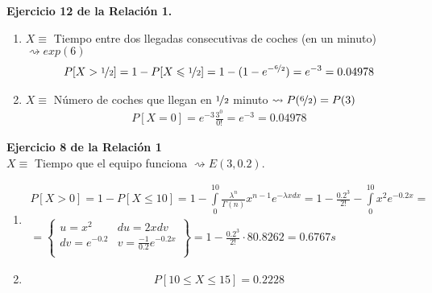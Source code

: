\begin{ejercicio}\textbf{Ejercicio 12 de la Relación 1.}
    \begin{enumerate}[label=\alph*)]
        \item $X\equiv$ Tiempo entre dos llegadas consecutivas de coches (en un minuto) $\rightsquigarrow exp(6)$
        \begin{gather*}
            P[X>\nicefrac{1}{2}] = 1 - P [X\leq \nicefrac{1}{2}] = 1-(1-e^{-\nicefrac{6}{2}}) = e^{-3} = 0.04978
        \end{gather*}
        \item $X\equiv$ Número de coches que llegan en $\nicefrac{1}{2}$ minuto $\rightsquigarrow P(\nicefrac{6}{2}) = P(3)$
        \begin{gather*}
            P[X=0] = e^{-3}\frac{3^0}{0!} = e^{-3} = 0.04978
        \end{gather*}
    \end{enumerate}
    
\end{ejercicio}

\begin{ejercicio}\textbf{Ejercicio 8 de la Relación 1}\\
    $X\equiv$ Tiempo que el equipo funciona $\rightsquigarrow E(3,0.2)$.

    \begin{enumerate}[label=\alph*)]    
        \item \begin{gather*}
            P[X>0] = 1-P[X\leq 10] = 1 -\int\limits_{0}^{10} \frac{\lambda^n}{\Gamma(n)} x^{n-1} e^{-\lambda x dx} = 1-\frac{0.2^3}{2!}-\int\limits_{0}^{10} x^2 e^{-0.2x} =\\=\left\{
            \begin{array}{cc}
                u=x^2 & du=2xdv\\
                dv=e^{-0.2} & v=\frac{-1}{0.2}e^{-0.2x}\\
            \end{array}
            \right\} = 1-\frac{0.2^3}{2!} \cdot 80.8262 = 0.6767s
        \end{gather*}
        \item \begin{gather*}
            P[10\leq X \leq 15] = 0.2228
        \end{gather*}
    \end{enumerate}
\end{ejercicio}

